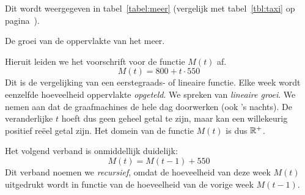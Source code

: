 Dit wordt weergegeven in tabel~\ref{tabel:meer} (vergelijk met tabel~\ref{tbl:taxi} op pagina~\pageref{tbl:taxi}).
 \begin{table}[htb]
    \centering
    \vspace{0.3cm}
        \caption{De groei van de oppervlakte  van het meer.}
\label{tabel:meer}
 \end{table}
 
\noindent
Hieruit leiden we  het voorschrift voor de functie $M(t)$ af.
\begin{displaymath}
    M(t)=800+t\cdot 550
\end{displaymath}
Dit is de vergelijking van  een eerstegraads- of lineaire functie. Elke week wordt  eenzelfde hoeveelheid oppervlakte \emph{opgeteld}. We spreken van \emph{lineaire groei}. We nemen aan dat de graafmachines de hele dag doorwerken (ook 's nachts). De veranderlijke $t$ hoeft dus geen geheel getal te zijn, maar kan een willekeurig positief reëel getal zijn. Het domein van de functie $M(t)$ is dus $\mathbb{R}^+$. 


Het volgend verband is onmiddellijk duidelijk:
\begin{displaymath}
    M(t)=M(t-1) +550
\end{displaymath}
 Dit verband noemen we \emph{recursief}, omdat de hoeveelheid van deze  week $M(t)$ uitgedrukt wordt in functie van de hoeveelheid van de vorige week $M(t-1)$.

